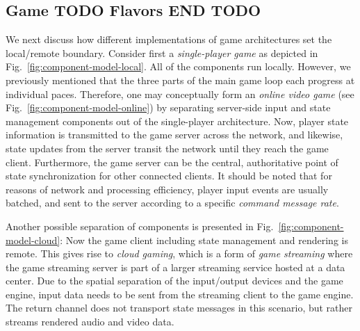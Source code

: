 



\subsection{Game TODO Flavors END TODO}

We next discuss how different implementations of game architectures  
set the local/remote boundary. Consider first a \textit{single-player game}
as depicted in Fig.~\ref{fig:component-model-local}. All of the 
components run locally. However, we previously mentioned that the 
three parts of the main game loop each progress at individual paces. 
Therefore, one may conceptually form an \textit{online video game} (see 
Fig.~\ref{fig:component-model-online}) by separating server-side 
input and state management components out of the single-player 
architecture. Now, player state information is transmitted to the 
game server across the network, and likewise, state updates from 
the server transit the network until they reach the game client.
Furthermore, the game server can be the central, authoritative 
point of state synchronization for other connected clients.
It should be noted that for reasons of network and processing efficiency, 
player input events are usually batched, and sent to the server according 
to a specific \textit{command message rate}.


Another possible separation of components is presented in 
Fig.~\ref{fig:component-model-cloud}: Now the game client including 
state management and rendering is remote. This gives rise to 
\textit{cloud gaming}, which is a form of \textit{game streaming} 
where the game streaming server is part of a larger streaming service 
hosted at a data center. Due to the spatial separation of the 
input/output devices and the game engine, input data needs to be 
sent from the streaming client to the game engine. The return channel 
does not transport state messages in this scenario, but rather streams 
rendered audio and video data.

